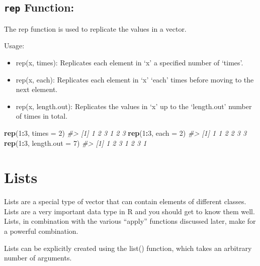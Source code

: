 \documentclass[
]{book}
\newenvironment{Shaded}{\begin{snugshade}}{\end{snugshade}}
\newcommand{\AttributeTok}[1]{\textcolor[rgb]{0.13,0.29,0.53}{#1}}
\newcommand{\CommentTok}[1]{\textcolor[rgb]{0.56,0.35,0.01}{\textit{#1}}}
\newcommand{\DecValTok}[1]{\textcolor[rgb]{0.00,0.00,0.81}{#1}}
\newcommand{\FunctionTok}[1]{\textcolor[rgb]{0.13,0.29,0.53}{\textbf{#1}}}
\newcommand{\NormalTok}[1]{#1}
\newcommand{\SpecialCharTok}[1]{\textcolor[rgb]{0.81,0.36,0.00}{\textbf{#1}}}
\begin{document}
\subsection{\texorpdfstring{\texttt{rep} Function:}{rep Function:}}\label{rep-function}

The rep function is used to replicate the values in a vector.

Usage:

\begin{itemize}
\item
  rep(x, times): Replicates each element in `x' a specified number of `times'.
\item
  rep(x, each): Replicates each element in `x' `each' times before moving to the next element.
\item
  rep(x, length.out): Replicates the values in `x' up to the `length.out' number of times in total.
\end{itemize}

\begin{Shaded}
\begin{Highlighting}[]
\FunctionTok{rep}\NormalTok{(}\DecValTok{1}\SpecialCharTok{:}\DecValTok{3}\NormalTok{, }\AttributeTok{times =} \DecValTok{2}\NormalTok{)}
\CommentTok{\#\textgreater{} [1] 1 2 3 1 2 3}
\FunctionTok{rep}\NormalTok{(}\DecValTok{1}\SpecialCharTok{:}\DecValTok{3}\NormalTok{, }\AttributeTok{each =} \DecValTok{2}\NormalTok{)       }
\CommentTok{\#\textgreater{} [1] 1 1 2 2 3 3}
\FunctionTok{rep}\NormalTok{(}\DecValTok{1}\SpecialCharTok{:}\DecValTok{3}\NormalTok{, }\AttributeTok{length.out =} \DecValTok{7}\NormalTok{)   }
\CommentTok{\#\textgreater{} [1] 1 2 3 1 2 3 1}
\end{Highlighting}
\end{Shaded}

\section*{Lists}\label{lists}

Lists are a special type of vector that can contain elements of different classes. Lists are a very important data type in R and you should get to know them well. Lists, in combination with the various ``apply'' functions discussed later, make for a powerful combination.

Lists can be explicitly created using the list() function, which takes an arbitrary number of arguments.
\end{document}
